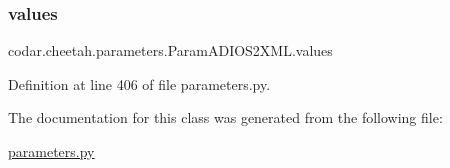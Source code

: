 \subsubsection{\texorpdfstring{values}{values}}
{\footnotesize\ttfamily codar.\+cheetah.\+parameters.\+Param\+A\+D\+I\+O\+S2\+X\+M\+L.\+values}



Definition at line 406 of file parameters.\+py.



The documentation for this class was generated from the following file\+:\begin{DoxyCompactItemize}
\item 
\hyperlink{parameters_8py}{parameters.\+py}\end{DoxyCompactItemize}
